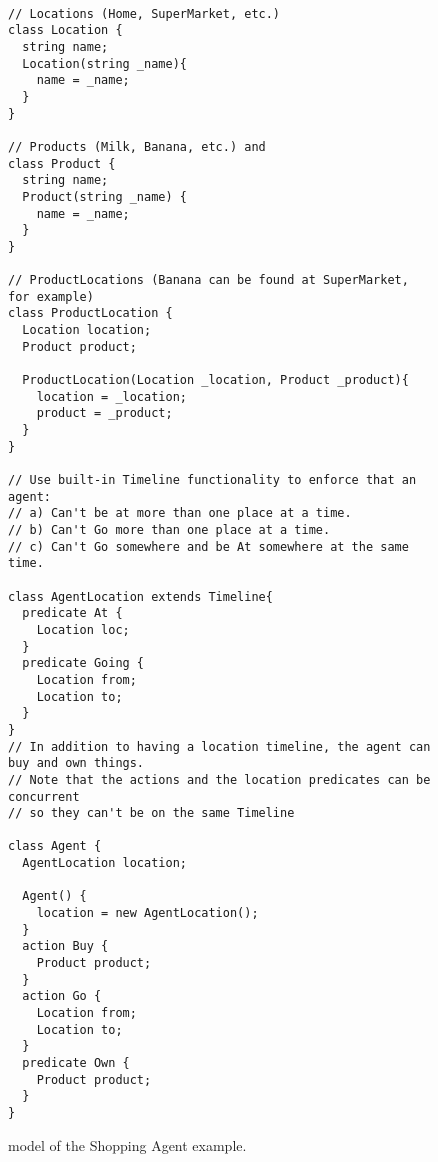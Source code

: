 \begin{figure}[h!]
\begin{verbatim}

// Locations (Home, SuperMarket, etc.)
class Location {
  string name;
  Location(string _name){
    name = _name;
  }
}

// Products (Milk, Banana, etc.) and
class Product {
  string name;
  Product(string _name) {
    name = _name;
  }
}

// ProductLocations (Banana can be found at SuperMarket, for example)
class ProductLocation {
  Location location;
  Product product;

  ProductLocation(Location _location, Product _product){
    location = _location;
    product = _product;
  }
}

// Use built-in Timeline functionality to enforce that an agent:
// a) Can't be at more than one place at a time.
// b) Can't Go more than one place at a time.
// c) Can't Go somewhere and be At somewhere at the same time.

class AgentLocation extends Timeline{
  predicate At {
    Location loc;
  }
  predicate Going {
    Location from;
    Location to;
  }
}
// In addition to having a location timeline, the agent can buy and own things.  
// Note that the actions and the location predicates can be concurrent 
// so they can't be on the same Timeline

class Agent {
  AgentLocation location;

  Agent() {
    location = new AgentLocation();
  }
  action Buy {
    Product product;
  }
  action Go {
    Location from;
    Location to;
  }
  predicate Own {
  	Product product;
  }
}

\end{verbatim}
\caption{\small \nd model of the Shopping Agent example.}
\label{fig:nddlshop}
\end{figure}
